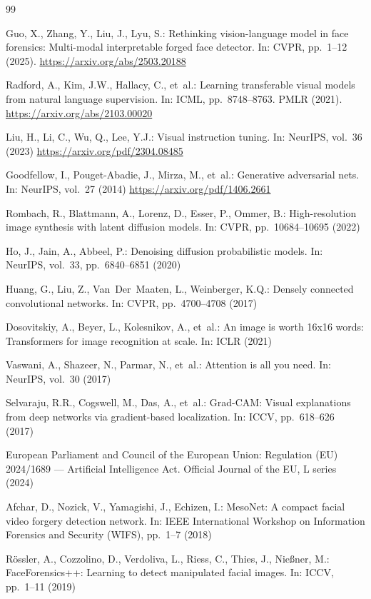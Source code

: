\documentclass[pdflatex,sn-mathphys-num]{sn-jnl}
\begin{document}
\begin{thebibliography}{99}

Guo, X., Zhang, Y., Liu, J., Lyu, S.:
Rethinking vision-language model in face forensics: Multi-modal interpretable forged face detector.
In: CVPR, pp.~1--12 (2025).
\url{https://arxiv.org/abs/2503.20188}

Radford, A., Kim, J.W., Hallacy, C., et~al.:
Learning transferable visual models from natural language supervision.
In: ICML, pp.~8748--8763. PMLR (2021).
\url{https://arxiv.org/abs/2103.00020}

Liu, H., Li, C., Wu, Q., Lee, Y.J.:
Visual instruction tuning.
In: NeurIPS, vol.~36 (2023)
\url{https://arxiv.org/pdf/2304.08485}

Goodfellow, I., Pouget-Abadie, J., Mirza, M., et~al.:
Generative adversarial nets.
In: NeurIPS, vol.~27 (2014)
\url{https://arxiv.org/pdf/1406.2661}

Rombach, R., Blattmann, A., Lorenz, D., Esser, P., Ommer, B.:
High-resolution image synthesis with latent diffusion models.
In: CVPR, pp.~10684--10695 (2022)

Ho, J., Jain, A., Abbeel, P.:
Denoising diffusion probabilistic models.
In: NeurIPS, vol.~33, pp.~6840--6851 (2020)

Huang, G., Liu, Z., Van~Der~Maaten, L., Weinberger, K.Q.:
Densely connected convolutional networks.
In: CVPR, pp.~4700--4708 (2017)

Dosovitskiy, A., Beyer, L., Kolesnikov, A., et~al.:
An image is worth 16x16 words: Transformers for image recognition at scale.
In: ICLR (2021)

Vaswani, A., Shazeer, N., Parmar, N., et~al.:
Attention is all you need.
In: NeurIPS, vol.~30 (2017)

Selvaraju, R.R., Cogswell, M., Das, A., et~al.:
Grad-CAM: Visual explanations from deep networks via gradient-based localization.
In: ICCV, pp.~618--626 (2017)

European Parliament and Council of the European Union:
Regulation (EU) 2024/1689 --- Artificial Intelligence Act.
Official Journal of the EU, L series (2024)

Afchar, D., Nozick, V., Yamagishi, J., Echizen, I.:
MesoNet: A compact facial video forgery detection network.
In: IEEE International Workshop on Information Forensics and Security (WIFS), pp.~1--7 (2018)

Rössler, A., Cozzolino, D., Verdoliva, L., Riess, C., Thies, J., Nießner, M.:
FaceForensics++: Learning to detect manipulated facial images.
In: ICCV, pp.~1--11 (2019)

\end{thebibliography}
\end{document}
